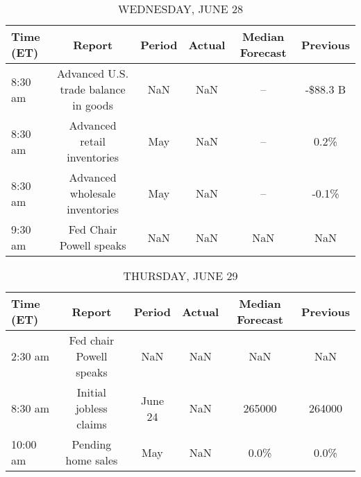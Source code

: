\documentclass{article}%
\begin{document}
\begin{table}[htbp]%
\caption{WEDNESDAY, JUNE 28}%
\centering%
\begin{adjustbox}{width=1\textwidth}%
\begin{tabular}{lccccc}
\toprule
Time (ET) &                               Report & Period & Actual & Median Forecast & Previous \\
\midrule
  8:30 am & Advanced U.S. trade balance in goods &    NaN &    NaN &              -- & -\$88.3 B \\
  8:30 am &          Advanced retail inventories &    May &    NaN &              -- &     0.2\% \\
  8:30 am &       Advanced wholesale inventories &    May &    NaN &              -- &    -0.1\% \\
  9:30 am &              Fed Chair Powell speaks &    NaN &    NaN &             NaN &      NaN \\
\bottomrule
\end{tabular}
%
\end{adjustbox}%
\end{table}

%


\begin{table}[htbp]%
\caption{THURSDAY, JUNE 29}%
\centering%
\begin{adjustbox}{width=1\textwidth}%
\begin{tabular}{lccccc}
\toprule
Time (ET) &                  Report &  Period & Actual & Median Forecast & Previous \\
\midrule
  2:30 am & Fed chair Powell speaks &     NaN &    NaN &             NaN &      NaN \\
  8:30 am &  Initial jobless claims & June 24 &    NaN &          265000 &   264000 \\
 10:00 am &      Pending home sales &     May &    NaN &            0.0\% &     0.0\% \\
\bottomrule
\end{tabular}
%
\end{adjustbox}%
\end{table}

%
\end{document}
